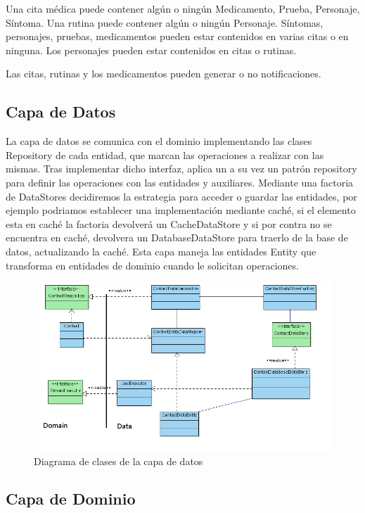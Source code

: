 \documentclass[../pfc.tex]{subfiles}
\begin{document}
		Una cita médica puede contener algún o ningún Medicamento, Prueba, Personaje, Síntoma.
		Una rutina puede contener algún o ningún Personaje.
		Síntomas, personajes, pruebas, medicamentos pueden estar contenidos en varias citas o en ninguna.
		Los personajes pueden estar contenidos en citas o rutinas.
		
		Las citas, rutinas y los medicamentos pueden generar o no notificaciones.
		
		

	\subsection{Capa de Datos}
	
	La capa de datos se comunica con el dominio implementando las clases Repository de cada entidad, que marcan las operaciones a realizar con las mismas. Tras implementar dicho interfaz, aplica un a su vez un patrón repository para definir las operaciones con las entidades y auxiliares. Mediante una factoria de DataStores decidiremos la estrategia para acceder o guardar las entidades, por ejemplo podriamos establecer una implementación mediante caché, si el elemento esta en caché la factoria devolverá un CacheDataStore y si por contra no se encuentra en caché, devolvera un DatabaseDataStore para traerlo de la base de datos, actualizando la caché. Esta capa maneja las entidades Entity que transforma en entidades de dominio cuando le solicitan operaciones. 
	
	\begin{figure}[H]
		\centering
		\includegraphics[width=0.8\linewidth]{../images/DataClasesDiagram}
		\caption{Diagrama de clases de la capa de datos}
		\label{fig:Clases de la capa Data}
	\end{figure}
	
	\subsection{Capa de Dominio}
	
\end{document}

